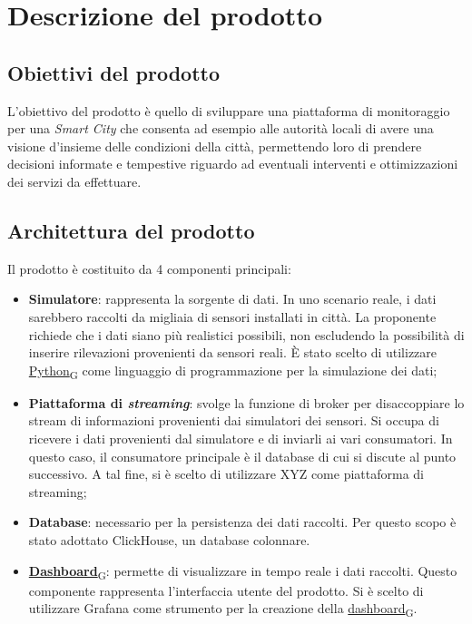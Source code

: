 \section{Descrizione del prodotto}
\subsection{Obiettivi del prodotto}
L'obiettivo del prodotto è quello di sviluppare una piattaforma di monitoraggio per una \textit{Smart City} che consenta
ad esempio alle autorità locali di avere una visione d'insieme delle condizioni della città, permettendo loro
di prendere decisioni informate e tempestive riguardo ad eventuali interventi e ottimizzazioni dei servizi da effettuare.

\subsection{Architettura del prodotto}
Il prodotto è costituito da 4 componenti principali:
\begin{itemize}
	\item \textbf{Simulatore}: rappresenta la sorgente di dati. In uno scenario reale, i dati sarebbero raccolti da migliaia di sensori
	      installati in città. La proponente richiede che i dati siano più realistici possibili, non escludendo la possibilità di inserire rilevazioni provenienti da sensori reali.
	      È stato scelto di utilizzare \href{https://7last.github.io/docs/rtb/documentazione-interna/glossario\#python}{Python\textsubscript{G}} come linguaggio di programmazione per la simulazione dei dati;
	\item \textbf{Piattaforma di \textit{streaming}}: svolge la funzione di broker per disaccoppiare lo stream di informazioni provenienti dai simulatori dei sensori.
	      Si occupa di ricevere i dati provenienti dal simulatore e di inviarli ai vari consumatori. In questo caso, il consumatore principale è il database
	      di cui si discute al punto successivo.
	      A tal fine, si è scelto di utilizzare XYZ come piattaforma di streaming; %
	\item \textbf{Database}: necessario per la persistenza dei dati raccolti. Per questo scopo è stato adottato ClickHouse, un database colonnare.
	\item \href{https://7last.github.io/docs/rtb/documentazione-interna/glossario\#dashboard}{\textbf{Dashboard}\textsubscript{G}}: permette di visualizzare in tempo reale i dati raccolti. Questo componente rappresenta l'interfaccia utente del prodotto.
	      Si è scelto di utilizzare Grafana come strumento per la creazione della \href{https://7last.github.io/docs/rtb/documentazione-interna/glossario\#dashboard}{dashboard\textsubscript{G}}.
\end{itemize}

